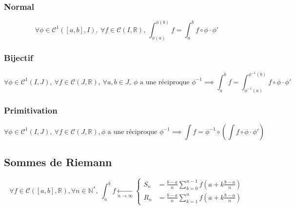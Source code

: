 \documentclass{article}
\newcommand{\R}{{\mathbb R}}
\newcommand{\N}{{\mathbb N}}
\newcommand{\cC}{{\mathcal C}}
\newcommand{\convergedby}[2]{\xleftarrow[{#1\to #2}]{}}
\begin{document}
\subsubsection{Normal}


\[
	\forall \phi \in \cC^1([a, b], I),\ \forall f \in \cC(I, \R),\ 
	\int_{\phi(a)}^{\phi(b)} f = \int_a^b f \circ \phi \cdot \phi'
\] 

\subsubsection{Bijectif}

\[
	\forall \phi\in \cC^1(I, J),\ \forall f \in \cC(J, \R),\ \forall a, b \in J,\ \text{$\phi$ a une réciproque $\phi^{-1}$} \implies
	\int_a^b f = \int_{\phi^{-1}(a)}^{\phi^{-1}(b)} f \circ \phi \cdot \phi'
\] 

\subsubsection{Primitivation}

\[
\forall \phi\in \cC^1(I, J),\ 	\forall f\in \cC(J, \R), \text{$\phi$ a une réciproque $\phi^{-1}$} \implies \int f = \phi^{-1} \circ \left(\int f\circ \phi \cdot \phi'\right)
\] 

\subsection{Sommes de Riemann}

\[
	\forall f\in \cC([a, b], \R), \forall n \in \N^\ast,\ 
	\int_a^b f\convergedby{n}{\infty} \begin{cases}
		S_n &= {\displaystyle \frac{b-a}{n} \sum_{k=0}^{n-1} f\left(a+k\frac{b-a}{n}\right)} \\
	R_n &= {\displaystyle \frac{b-a}{n} \sum_{k=1}^{n} f\left(a+k\frac{b-a}{n}\right) }
	\end{cases}
\] 
\end{document}

